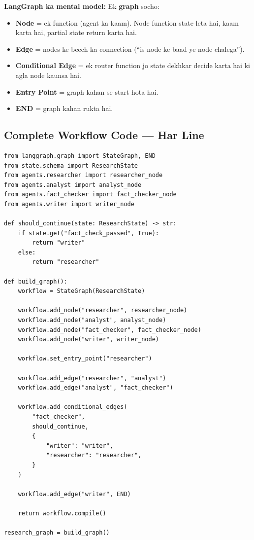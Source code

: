 \documentclass[11pt, a4paper]{article}
\begin{document}
\begin{conceptbox}
\textbf{LangGraph ka mental model:} Ek \textbf{graph} socho:
\begin{itemize}
\item \textbf{Node} = ek function (agent ka kaam). Node function state leta hai, kaam karta hai, partial state return karta hai.
\item \textbf{Edge} = nodes ke beech ka connection (``is node ke baad ye node chalega'').
\item \textbf{Conditional Edge} = ek router function jo state dekhkar decide karta hai ki agla node kaunsa hai.
\item \textbf{Entry Point} = graph kahan se start hota hai.
\item \textbf{END} = graph kahan rukta hai.
\end{itemize}
\end{conceptbox}

\subsection{Complete Workflow Code --- Har Line}

\begin{lstlisting}[style=pythonstyle, caption={graph/workflow.py --- Poora Code}]
from langgraph.graph import StateGraph, END
from state.schema import ResearchState
from agents.researcher import researcher_node
from agents.analyst import analyst_node
from agents.fact_checker import fact_checker_node
from agents.writer import writer_node

def should_continue(state: ResearchState) -> str:
    if state.get("fact_check_passed", True):
        return "writer"
    else:
        return "researcher"

def build_graph():
    workflow = StateGraph(ResearchState)

    workflow.add_node("researcher", researcher_node)
    workflow.add_node("analyst", analyst_node)
    workflow.add_node("fact_checker", fact_checker_node)
    workflow.add_node("writer", writer_node)

    workflow.set_entry_point("researcher")

    workflow.add_edge("researcher", "analyst")
    workflow.add_edge("analyst", "fact_checker")

    workflow.add_conditional_edges(
        "fact_checker",
        should_continue,
        {
            "writer": "writer",
            "researcher": "researcher",
        }
    )

    workflow.add_edge("writer", END)

    return workflow.compile()

research_graph = build_graph()
\end{lstlisting}
\end{document}
